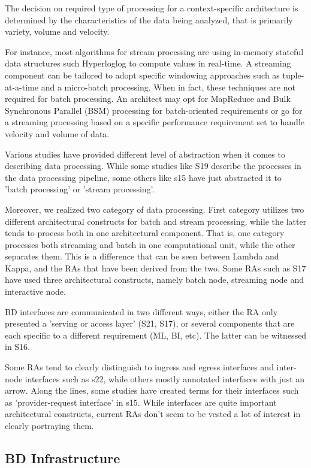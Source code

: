 \documentclass{ieeeaccess}
\begin{document}
The decision on required type of processing for a context-specific architecture is determined by the characteristics of the data being analyzed, that is primarily variety, volume and velocity. 

For instance, most algorithms for stream processing are using in-memory stateful data structures such Hyperloglog to compute values in real-time. A streaming component can be tailored to adopt specific windowing approaches such as tuple-at-a-time and a micro-batch processing. When in fact, these techniques are not required for batch processing. An architect may opt for MapReduce and Bulk Synchronous Parallel (BSM) processing for batch-oriented requirements or go for a streaming processing based on a specific performance requirement set to handle velocity and volume of data. 

Various studies have provided different level of abstraction when it comes to describing data processing. While some studies like S19 describe the processes in the data processing pipeline, some others like s15 have just abstracted it to 'batch processing' or 'stream processing'. 

Moreover, we realized two category of data processing. First category utilizes two different architectural constructs for batch and stream processing, while the latter tends to process both in one architectural component. That is, one category processes both streaming and batch in one computational unit, while the other separates them. This is a difference that can be seen between Lambda and Kappa, and the RAs that have been derived from the two. Some RAs such as S17 have used three architectural constructs, namely batch node, streaming node and interactive node. 

BD interfaces are communicated in two different ways, either the RA only presented a 'serving or access layer' (S21, S17), or several components that are each specific to a different requirement (ML, BI, etc). The latter can be witnessed in S16.

Some RAs tend to clearly distinguish to ingress and egress interfaces and inter-node interfaces such as s22, while others mostly annotated interfaces with just an arrow. Along the lines, some studies have created terms for their interfaces such as 'provider-request interface' in s15. While interfaces are quite important architectural constructs, current RAs don't seem to be vested a lot of interest in clearly portraying them. 

\subsection{BD Infrastructure}
\end{document}
